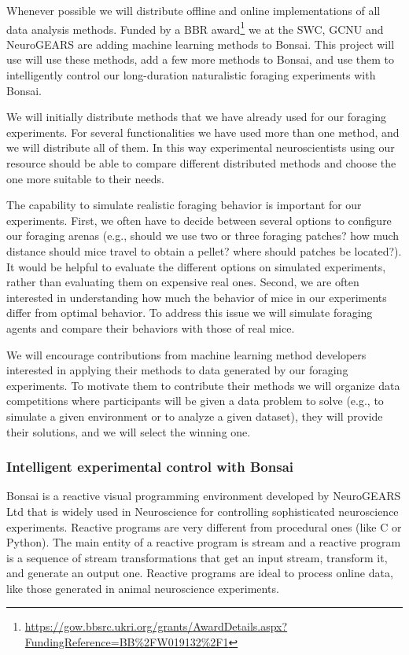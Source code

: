 Whenever possible we will distribute offline and online implementations of all
data analysis methods.
%
Funded by a BBR
award\footnote{\url{https://gow.bbsrc.ukri.org/grants/AwardDetails.aspx?FundingReference=BB\%2FW019132\%2F1}}
we at the SWC, GCNU and NeuroGEARS are adding machine learning methods to
Bonsai. This project will use will use these methods, add a few more methods to
Bonsai, and use them to intelligently control our long-duration naturalistic
foraging experiments with Bonsai.

We will initially distribute methods that we have already used for our foraging
experiments. For several functionalities we have used more than one method, and
we will distribute all of them. In this way experimental neuroscientists using
our resource should be able to compare different distributed methods and choose
the one more suitable to their needs.

The capability to simulate realistic foraging behavior is important for our
experiments. First, we often have to decide between several options to
configure our foraging arenas (e.g., should we use two or three foraging
patches? how much distance should mice travel to obtain a pellet? where should
patches be located?). It would be helpful to evaluate the different options on
simulated experiments, rather than evaluating them on expensive real
ones. Second, we are often interested in understanding how much the
behavior of mice in our experiments differ from optimal behavior. To address
this issue we will simulate foraging agents and
compare their behaviors with those of real mice.

We will encourage contributions from machine learning method developers
interested in applying their methods to data generated by our foraging
experiments. To motivate them to contribute their methods we will organize data
competitions where participants will be given a data problem to solve (e.g., to
simulate a given environment or to analyze a given dataset), they will provide
their solutions, and we will select the winning one.

\subsubsection*{Intelligent experimental control with Bonsai}

Bonsai is a reactive visual programming environment developed by NeuroGEARS Ltd
that is widely used in Neuroscience for controlling sophisticated neuroscience
experiments. Reactive programs are very different from procedural ones (like C
or Python). The main entity of a reactive program is stream and a reactive
program is a sequence of stream transformations that get an input stream,
transform it, and generate an output one. Reactive programs are ideal to
process online data, like those generated in animal neuroscience experiments.

